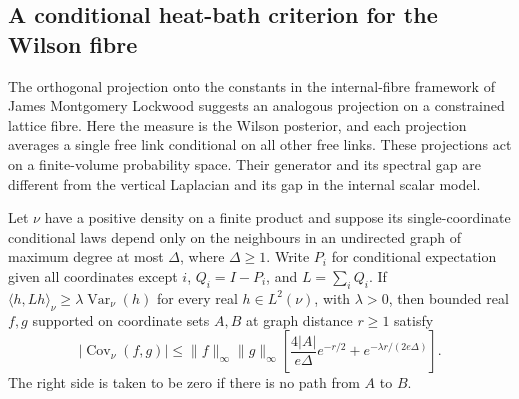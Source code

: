 \subsection{A conditional heat-bath criterion for the Wilson fibre}
\label{ssec:fibre-heatbath}

The orthogonal projection onto the constants in the internal-fibre
framework of James Montgomery Lockwood suggests an
analogous projection on a constrained lattice fibre. Here the measure is
the Wilson posterior, and each projection averages a single free link
conditional on all other free links. These projections act on a
finite-volume probability space. Their generator and its spectral gap
are different from the vertical Laplacian and its gap in the internal
scalar model.

\begin{lemma}\label{lem:fibre-heatbath}
Let $\nu$ have a positive density on a finite product and suppose its
single-coordinate conditional laws depend only on the neighbours in an
undirected graph of maximum degree at most $\Delta$, where $\Delta\ge1$.
Write $P_i$ for conditional expectation given all coordinates except $i$,
$Q_i=I-P_i$, and $L=\sum_i Q_i$. If
$\langle h,Lh\rangle_\nu\ge\lambda\operatorname{Var}_\nu(h)$ for every real
$h\in L^2(\nu)$, with $\lambda>0$, then bounded real $f,g$ supported on
coordinate sets $A,B$ at graph distance $r\ge1$ satisfy
\[
 |\operatorname{Cov}_\nu(f,g)|\le
 \|f\|_\infty\|g\|_\infty
 \left[\frac{4|A|}{e\Delta}e^{-r/2}
        +e^{-\lambda r/(2e\Delta)}\right].
\]
The right side is taken to be zero if there is no path from $A$ to $B$.
\end{lemma}

